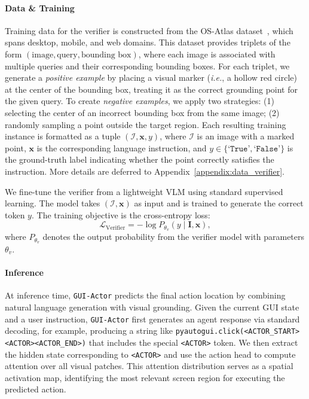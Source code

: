 \documentclass{article}
\newcommand{\ie}{\textit{i.e.}}
\newcommand{\sys}{\texttt{GUI-Actor}\xspace}
\begin{document}
\paragraph{Data \& Training} Training data for the verifier is constructed from the OS-Atlas dataset~\cite{wu2024atlas}, which spans desktop, mobile, and web domains.
This dataset provides triplets of the form $(\text{image}, \text{query}, \text{bounding box})$, where each image is associated with multiple queries and their corresponding bounding boxes. For each triplet, we generate a \textit{positive example} by placing a visual marker (\ie, a hollow red circle) at the center of the bounding box, treating it as the correct grounding point for the given query.
To create \textit{negative examples}, we apply two strategies:
(1) selecting the center of an incorrect bounding box from the same image; (2) randomly sampling a point outside the target region. Each resulting training instance is formatted as a tuple $(\mathcal{I}, \mathbf{x}, y)$, where $\mathcal{I}$ is an image with a marked point, $\mathbf{x}$ is the corresponding language instruction, and $y \in \{\texttt{`True'}, \texttt{`False'}\}$ is the ground-truth label indicating whether the point correctly satisfies the instruction. More details are deferred to Appendix~\ref{appendix:data_verifier}.

We fine-tune the verifier from a lightweight VLM using standard supervised learning. The model takes $(\mathcal{I}, \mathbf{x})$ as input and is trained to generate the correct token $y$. The training objective is the cross-entropy loss:
\[
\mathcal{L}_{\text{Verifier}} = - \log P_{\theta_v}(y \mid \mathbf{I}, \mathbf{x}),
\]
where $P_{\theta_v}$ denotes the output probability from the verifier model with parameters $\theta_v$.

\paragraph{Inference} At inference time, \sys predicts the final action location by combining natural language generation with visual grounding. Given the current GUI state and a user instruction, \sys first generates an agent response via standard decoding, for example, producing a string like \texttt{pyautogui.click(<ACTOR\_START><ACTOR><ACTOR\_END>)} that includes the special \texttt{<ACTOR>} token. We then extract the hidden state corresponding to \texttt{<ACTOR>} and use the action head to compute attention over all visual patches. This attention distribution serves as a spatial activation map, identifying the most relevant screen region for executing the predicted action.
\end{document}
